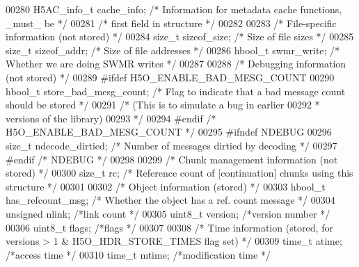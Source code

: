\begin{DoxyCode}
00280     H5AC\_info\_t cache\_info; \textcolor{comment}{/* Information for metadata cache functions, \_must\_ be */}
00281                             \textcolor{comment}{/* first field in structure */}
00282 
00283     \textcolor{comment}{/* File-specific information (not stored) */}
00284     \textcolor{keywordtype}{size\_t}      sizeof\_size;            \textcolor{comment}{/* Size of file sizes            */}
00285     \textcolor{keywordtype}{size\_t}      sizeof\_addr;            \textcolor{comment}{/* Size of file addresses        */}
00286     hbool\_t     swmr\_write;             \textcolor{comment}{/* Whether we are doing SWMR writes  */}
00287 
00288     \textcolor{comment}{/* Debugging information (not stored) */}
00289 \textcolor{preprocessor}{#ifdef H5O\_ENABLE\_BAD\_MESG\_COUNT}
00290     hbool\_t     store\_bad\_mesg\_count;   \textcolor{comment}{/* Flag to indicate that a bad message count should be stored */}
00291                                         \textcolor{comment}{/* (This is to simulate a bug in earlier}
00292 \textcolor{comment}{                                         *      versions of the library)}
00293 \textcolor{comment}{                                         */}
00294 \textcolor{preprocessor}{#endif }\textcolor{comment}{/* H5O\_ENABLE\_BAD\_MESG\_COUNT */}\textcolor{preprocessor}{}
00295 \textcolor{preprocessor}{#ifndef NDEBUG}
00296     \textcolor{keywordtype}{size\_t}      ndecode\_dirtied;        \textcolor{comment}{/* Number of messages dirtied by decoding */}
00297 \textcolor{preprocessor}{#endif }\textcolor{comment}{/* NDEBUG */}\textcolor{preprocessor}{}
00298 
00299     \textcolor{comment}{/* Chunk management information (not stored) */}
00300     \textcolor{keywordtype}{size\_t}      rc;                     \textcolor{comment}{/* Reference count of [continuation] chunks using this structure */}
00301 
00302     \textcolor{comment}{/* Object information (stored) */}
00303     hbool\_t     has\_refcount\_msg;       \textcolor{comment}{/* Whether the object has a ref. count message */}
00304     \textcolor{keywordtype}{unsigned}    nlink;          \textcolor{comment}{/*link count                 */}
00305     uint8\_t version;        \textcolor{comment}{/*version number             */}
00306     uint8\_t flags;          \textcolor{comment}{/*flags                  */}
00307 
00308     \textcolor{comment}{/* Time information (stored, for versions > 1 & H5O\_HDR\_STORE\_TIMES flag set) */}
00309     time\_t      atime;                  \textcolor{comment}{/*access time                */}
00310     time\_t      mtime;                  \textcolor{comment}{/*modification time              */}

\end{DoxyCode}
